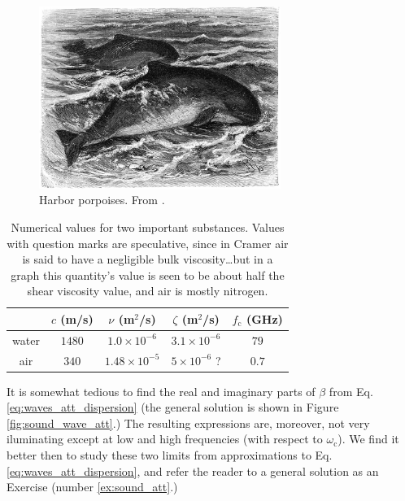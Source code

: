 \begin{figure}
  \begin{center}
    \includegraphics[width=0.7\textwidth]{figures/porpoises}
  \end{center}
  \caption{Harbor porpoises. From \cite{Brehms_Tierleben}.  \label{fig:porpoises}}
\end{figure}


\begin{table}
\begin{tabular}{|c|c|c|c|c|}
  \hline
    & $ c$ (m/s) &  $ \nu$ (m$^2$/s) & $\zeta$ (m$^2$/s) & $ f_\mathrm{c}$ (GHz)\\
  \hline
  \hline
  water & $1480$& $ 1.0 \times 10^{-6}$ & $ 3.1 \times 10^{-6}$ & $79$ \\
  \hline
  air & $340$   & $ 1.48\times 10^{-5}$ & $ 5 \times 10^{-6}$ ? & $0.7$ \\
  \hline
\end{tabular}
\caption{Numerical values for two important substances. Values with
  question marks are speculative, since in Cramer\cite{Cramer} air is
  said to have a negligible bulk viscosity\ldots but in a graph this
  quantity's value is seen to be about half the shear viscosity value,
  and air is mostly nitrogen.
 \label{tbl:sound_att}}
\end{table}

It is somewhat tedious to find the real and imaginary parts of $\beta$
from Eq. \ref{eq:waves_att_dispersion} (the general solution is shown
in Figure \ref{fig:sound_wave_att}.)  The resulting expressions are,
moreover, not very iluminating except at low and high frequencies
(with respect to $\omega_\mathrm{c}$). We find it better then to study
these two limits from approximations to
Eq. \ref{eq:waves_att_dispersion}, and refer the reader to a general
solution as an Exercise (number \ref{ex:sound_att}.)


